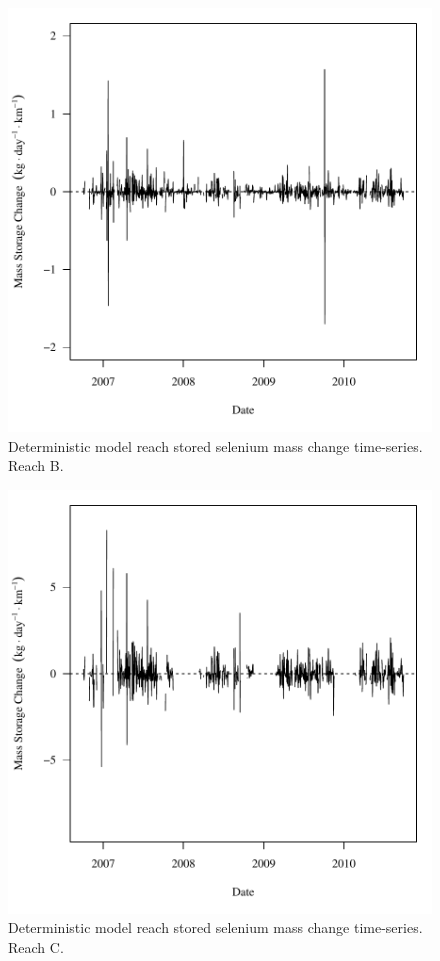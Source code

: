 \begin{figure}[htbp]
	\begin{center}
	\includegraphics[width=6in]{"Figures/Results_DUSR/f Segment B"}
	\caption{Deterministic model reach stored selenium mass change time-series.  Reach B.}
	\end{center}
\end{figure}
\newpage

\begin{figure}[htbp]
	\begin{center}
	\includegraphics[width=6in]{"Figures/Results_DUSR/f Segment C"}
	\caption{Deterministic model reach stored selenium mass change time-series.  Reach C.}
	\end{center}
\end{figure}
\newpage

